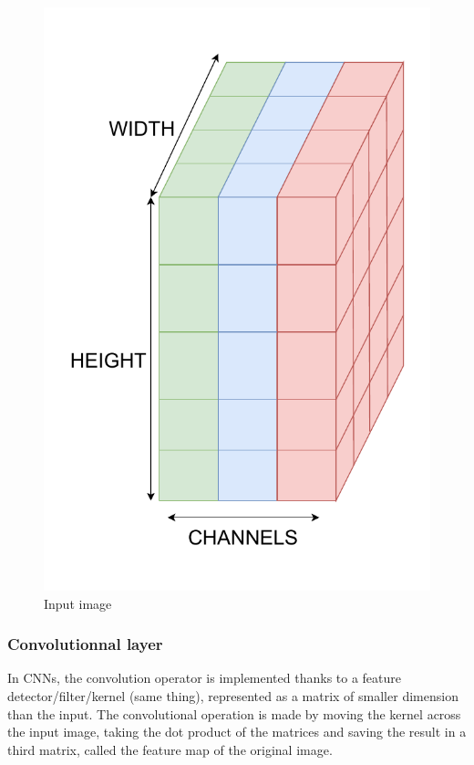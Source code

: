 \documentclass[twocolumn,superscriptaddress,aps]{revtex4-1}
\begin{document}
\begin{figure}[H]
    \centering
    \includegraphics[width=0.5\linewidth]{images/input_image.pdf}
    \caption{Input image}
    \label{fig:enter-label}
\end{figure}

\subsubsection{Convolutionnal layer}

In CNNs, the convolution operator is  implemented thanks to a feature detector/filter/kernel (same thing), represented as a matrix of smaller dimension than the input. The convolutional operation is made by moving the kernel across the input image, taking the dot product of the matrices and saving the result in a third matrix, called the feature map of the original image.
\end{document}
